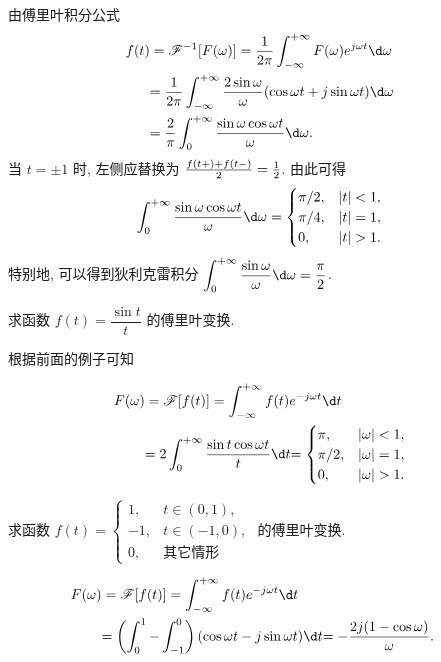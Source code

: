 由傅里叶积分公式
\begin{align*}
	f(t)&=\msf^{-1}[F(\omega)]=\frac1{2\pi}\int_{-\infty}^{+\infty}F(\omega)e^{j\omega t}\d\omega\\
	&{=\frac1{2\pi}\int_{-\infty}^{+\infty}\frac{2\sin\omega}{\omega}(\cos\omega t+j\sin\omega t)\d \omega}\\
	&{=\frac2\pi\int_0^{+\infty}\frac{\sin\omega\cos\omega t}{\omega}\d \omega.}
\end{align*}
当 $t=\pm1$ 时, 左侧应替换为 $\frac{f(t+)+f(t-)}2=\frac{1}{2} $.
由此可得
\[\int_0^{+\infty}\frac{\sin \omega\cos\omega t}\omega\d\omega=\begin{cases}
	\pi/2,&|t|<1,\\
	\pi/4,&|t|=1,\\
	0,&|t|>1.
\end{cases}\]
特别地, 可以得到狄利克雷积分
$\displaystyle\int_0^{+\infty}\frac{\sin\omega}\omega\d\omega=\frac\pi2$.

\begin{example}
	求函数 $f(t)=\dfrac{\sin t}{t}$ 的傅里叶变换.
\end{example}

\begin{solution}
	根据前面的例子可知

	\begin{align*}
		F(\omega)&=\msf[f(t)]=\int_{-\infty}^{+\infty}f(t)e^{-j\omega t}\d t\\
		&{=2\int_0^{+\infty}\frac{\sin t\cos\omega t}{t}\d t}
		{=\begin{cases}
			\pi,&|\omega|<1,\\
			\pi/2,&|\omega|=1,\\
			0,&|\omega|>1.
			\end{cases}}
	\end{align*}
\end{solution}

\begin{example}
	求函数 $f(t)=
		\begin{cases}
			1,&t\in(0,1),\\
			-1,&t\in(-1,0),\\
			0,&\text{其它情形}
		\end{cases}$
	的傅里叶变换.
\end{example}

\begin{solution}

	\begin{align*}
		F(\omega)&=\msf[f(t)]=\int_{-\infty}^{+\infty}f(t)e^{-j\omega t}\d t\\
		&{=\left(\int_0^1-\int_{-1}^0\right)(\cos\omega t-j\sin\omega t)\d t}
		{=-\frac{2j(1-\cos\omega)}\omega.}&{}
	\end{align*}
\end{solution}

